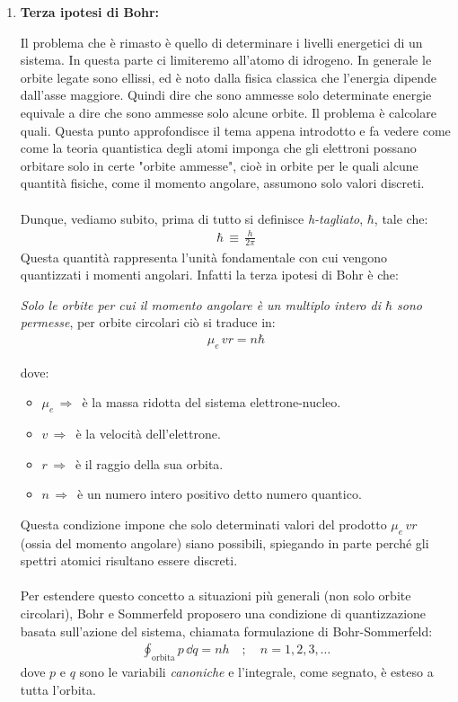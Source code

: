 \begin{enumerate}[label=\arabic*), start = 3]
	\item \textbf{Terza ipotesi di Bohr:}
	
		Il problema che è rimasto è quello di determinare i livelli energetici di un sistema. In questa parte ci limiteremo all'atomo di idrogeno. In generale le orbite legate sono ellissi, ed è noto dalla fisica classica che l'energia dipende dall'asse maggiore. Quindi dire che sono ammesse solo determinate energie equivale a dire che sono ammesse solo alcune orbite. Il problema è calcolare quali. Questa punto approfondisce il tema appena introdotto e fa vedere come come la teoria quantistica degli atomi imponga che gli elettroni possano orbitare solo in certe "orbite ammesse", cioè in orbite per le quali alcune quantità fisiche, come il momento angolare, assumono solo valori discreti. 
		\\
		\\
		Dunque, vediamo subito, prima di tutto si definisce \textit{h-tagliato}, $\hbar$, tale che:
	\begin{align*}
		\hbar \, \equiv \, \frac{h}{2\pi}
	\end{align*}
		 Questa quantità rappresenta l'unità fondamentale con cui vengono quantizzati i momenti angolari. Infatti la terza ipotesi di Bohr è che:
	\begin{nb}
		\textit{Solo le orbite per cui il momento angolare è un multiplo intero di $\hbar$ sono permesse}, per orbite circolari ciò si traduce in:
	\begin{align*}
		\mu_e \, vr = n \hbar
	\end{align*}
	\end{nb}
		dove:
	\begin{itemize}
		\item $\mu_e \, \Rightarrow \,$ è la massa ridotta del sistema elettrone-nucleo.
		\item $v \, \Rightarrow \,$ è la velocità dell'elettrone.
		\item $r \, \Rightarrow \,$ è il raggio della sua orbita.
		\item $n \, \Rightarrow \,$ è un numero intero positivo detto numero quantico.
	\end{itemize}
		Questa condizione impone che solo determinati valori del prodotto $\mu_e \, vr$ (ossia del momento angolare) siano possibili, spiegando in parte perché gli spettri atomici risultano essere discreti.
	\\
	\\
		Per estendere questo concetto a situazioni più generali (non solo orbite circolari), Bohr e Sommerfeld proposero una condizione di quantizzazione basata sull'azione del sistema, chiamata formulazione di Bohr-Sommerfeld:
	\begin{align*}
		\oint_{\text{orbita}} p \, \dd q = nh \quad ; \quad n=1, 2, 3, \dots
	\end{align*}
		 dove $p$ e $q$ sono le variabili \textit{canoniche} e l'integrale, come segnato, è esteso a tutta l'orbita. 


\end{enumerate}
